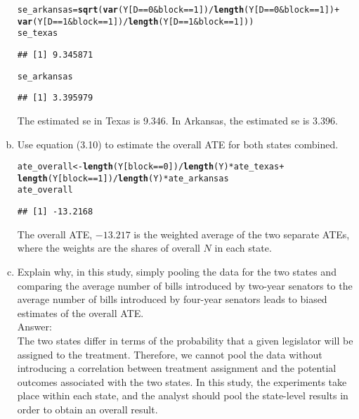 \documentclass[11pt,notitlepage]{article}\usepackage[]{graphicx}\usepackage[]{color}
\makeatletter
\newcommand{\hlnum}[1]{\textcolor[rgb]{0.686,0.059,0.569}{#1}}%
\newcommand{\hlopt}[1]{\textcolor[rgb]{0,0,0}{#1}}%
\newcommand{\hlstd}[1]{\textcolor[rgb]{0.345,0.345,0.345}{#1}}%
\newcommand{\hlkwb}[1]{\textcolor[rgb]{0.69,0.353,0.396}{#1}}%
\newcommand{\hlkwd}[1]{\textcolor[rgb]{0.737,0.353,0.396}{\textbf{#1}}}%
\newenvironment{kframe}{%
 \def\at@end@of@kframe{}%
 \ifinner\ifhmode%
  \def\at@end@of@kframe{\end{minipage}}%
  \begin{minipage}{\columnwidth}%
 \fi\fi%
 \def\FrameCommand##1{\hskip\@totalleftmargin \hskip-\fboxsep
 \colorbox{shadecolor}{##1}\hskip-\fboxsep
     \hskip-\linewidth \hskip-\@totalleftmargin \hskip\columnwidth}%
 \MakeFramed {\advance\hsize-\width
   \@totalleftmargin\z@ \linewidth\hsize
   \@setminipage}}%
 {\par\unskip\endMakeFramed%
 \at@end@of@kframe}
\newenvironment{knitrout}{}{} %
\makeatother
\begin{document}
\begin{enumerate}[a)]
\begin{knitrout}
\begin{kframe}
\begin{alltt}
\hlstd{se_arkansas} \hlkwb{=} \hlkwd{sqrt}\hlstd{(}\hlkwd{var}\hlstd{(Y[D}\hlopt{==}\hlnum{0} \hlopt{&} \hlstd{block}\hlopt{==}\hlnum{1}\hlstd{])}\hlopt{/}\hlkwd{length}\hlstd{(Y[D}\hlopt{==}\hlnum{0} \hlopt{&} \hlstd{block}\hlopt{==}\hlnum{1}\hlstd{])} \hlopt{+}
                   \hlkwd{var}\hlstd{(Y[D}\hlopt{==}\hlnum{1} \hlopt{&} \hlstd{block}\hlopt{==}\hlnum{1}\hlstd{])}\hlopt{/}\hlkwd{length}\hlstd{(Y[D}\hlopt{==}\hlnum{1} \hlopt{&} \hlstd{block}\hlopt{==}\hlnum{1}\hlstd{]))}
\hlstd{se_texas}
\end{alltt}
\begin{verbatim}
## [1] 9.345871
\end{verbatim}
\begin{alltt}
\hlstd{se_arkansas}
\end{alltt}
\begin{verbatim}
## [1] 3.395979
\end{verbatim}
\end{kframe}
\end{knitrout}

The estimated se in Texas is 9.346.  In Arkansas, the estimated se is 3.396.

\item Use equation (3.10) to estimate the overall ATE for both states combined.
\begin{knitrout}
\color{fgcolor}\begin{kframe}
\begin{alltt}
\hlstd{ate_overall} \hlkwb{<-} \hlkwd{length}\hlstd{(Y[block}\hlopt{==}\hlnum{0}\hlstd{])}\hlopt{/}\hlkwd{length}\hlstd{(Y)} \hlopt{*}\hlstd{ate_texas} \hlopt{+}
               \hlkwd{length}\hlstd{(Y[block}\hlopt{==}\hlnum{1}\hlstd{])}\hlopt{/}\hlkwd{length}\hlstd{(Y)} \hlopt{*}\hlstd{ate_arkansas}
\hlstd{ate_overall}
\end{alltt}
\begin{verbatim}
## [1] -13.2168
\end{verbatim}
\end{kframe}
\end{knitrout}

The overall ATE, \ensuremath{-13.217} is the weighted average of the two separate ATEs, where the weights are the shares of overall $N$ in each state.

\item Explain why, in this study, simply pooling the data for the two states and comparing the average number of bills introduced by two-year senators to the average number of bills introduced by four-year senators leads to biased estimates of the overall ATE. \\
Answer:\\
The two states differ in terms of the probability that a given legislator will be assigned to the treatment. Therefore, we cannot pool the data without introducing a correlation between treatment assignment and the potential outcomes associated with the two states. In this study, the experiments take place within each state, and the analyst should pool the state-level results in order to obtain an overall result.


\end{enumerate}
\end{document}
